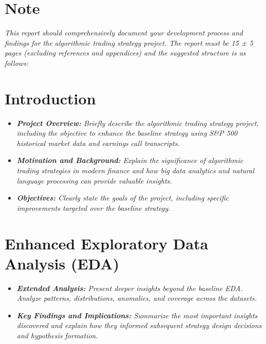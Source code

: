 \documentclass[11pt,twoside,a4paper]{article}
\begin{document}




\section*{Note}
\emph{This report should comprehensively document your development process and findings for the algorithmic trading strategy project. The report must be 15 ± 5 pages (excluding references and appendices) and the suggested structure is as follows:}

\section{Introduction}
\begin{itemize}
    \item \emph{\textbf{Project Overview:} Briefly describe the algorithmic trading strategy project, including the objective to enhance the baseline strategy using S\&P 500 historical market data and earnings call transcripts.}
    \item \emph{\textbf{Motivation and Background:} Explain the significance of algorithmic trading strategies in modern finance and how big data analytics and natural language processing can provide valuable insights.}
    \item \emph{\textbf{Objectives:} Clearly state the goals of the project, including specific improvements targeted over the baseline strategy.}
\end{itemize}

\section{Enhanced Exploratory Data Analysis (EDA)}
\begin{itemize}
    \item \emph{\textbf{Extended Analysis:} Present deeper insights beyond the baseline EDA. Analyze patterns, distributions, anomalies, and coverage across the datasets.}
    \item \emph{\textbf{Key Findings and Implications:} Summarize the most important insights discovered and explain how they informed subsequent strategy design decisions and hypothesis formation.}
\end{itemize}
\end{document}
